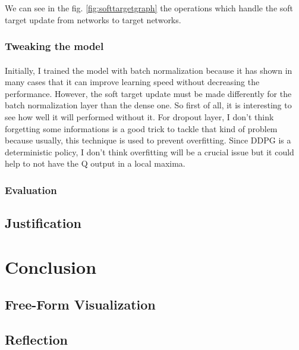 \documentclass{article}
\begin{document}
We can see in the fig. \ref{fig:softtargetgraph} the operations which handle the
soft target update from networks to target networks.

\subsubsection{Tweaking the model}
\paragraph{}

Initially, I trained the model with batch normalization because it has shown in
many cases that it can improve learning speed without decreasing the
performance. However, the soft target update must be made differently for the
batch normalization layer than the dense one. So first of all, it is interesting
to see how well it will performed without it. For dropout layer, I don't think
forgetting some informations is a good trick to tackle that kind of problem
because usually, this technique is used to prevent overfitting. Since DDPG is a
deterministic policy, I don't think overfitting will be a crucial issue but it
could help to not have the Q output in a local maxima.

\subsubsection{Evaluation}



\subsection{Justification}

\section{Conclusion}

\subsection{Free-Form Visualization}

\subsection{Reflection}
\end{document}
